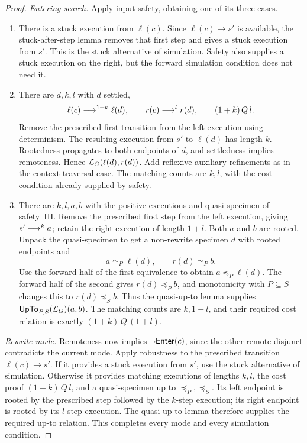 \begin{proof}
\emph{Entering search.} Apply input-safety, obtaining one of its three
cases.
\begin{enumerate}[label=\textup{(\Roman*)}]
\item There is a stuck execution from $\ell(c)$. Since
  $\ell(c)\to s'$ is available, the stuck-after-step lemma removes
  that first step and gives a stuck execution from $s'$. This is the
  stuck alternative of simulation. Safety also supplies a stuck execution
  on the right, but the forward simulation condition does not need it.
\item There are $d,k,l$ with $d$ settled,
  \[
    \ell(c)\mathrel{\longrightarrow^{1+k}}\ell(d),\qquad r(c)\mathrel{\longrightarrow^{l}}r(d),\qquad
    (1+k)\,Q\,l.
  \]
  Remove the prescribed first transition from the left execution using
  determinism. The resulting execution from $s'$ to $\ell(d)$ has
  length $k$. Rootedness propagates to both endpoints of $d$, and
  settledness implies remoteness. Hence
  $\mathcal L_G(\ell(d),r(d))$. Add reflexive auxiliary refinements as in
  the context-traversal case. The matching counts are $k,l$, with the
  cost condition already supplied by safety.
\item There are $k,l,a,b$ with the positive executions and quasi-specimen
  of safety~III. Remove the prescribed first step from the left execution,
  giving $s'\mathrel{\longrightarrow^{k}}a$; retain the right execution of length $1+l$.
  Both $a$ and $b$ are rooted. Unpack the quasi-specimen to get a
  non-rewrite specimen $d$ with rooted endpoints and
  \[
     a\simeq_P\ell(d),\qquad r(d)\simeq_P b.
  \]
  Use the forward half of the first equivalence to obtain
  $a\preceq_P\ell(d)$. The forward half of the second gives
  $r(d)\preceq_P b$, and monotonicity with $P\subseteq S$ changes
  this to $r(d)\preceq_S b$. Thus the quasi-up-to lemma supplies
  $\mathsf{UpTo}_{P,S}(\mathcal L_G)(a,b)$. The matching counts are $k,1+l$,
  and their required cost relation is exactly
  $(1+k)\,Q\,(1+l)$.
\end{enumerate}

\emph{Rewrite mode.} Remoteness now implies $\neg\mathsf{Enter}(c)$, since
the other remote disjunct contradicts the current mode. Apply robustness
to the prescribed transition $\ell(c)\to s'$. If it provides a stuck
execution from $s'$, use the stuck alternative of simulation. Otherwise
it provides matching executions of lengths $k,l$, the cost proof
$(1+k)\,Q\,l$, and a quasi-specimen up to $\preceq_P,\preceq_S$.
Its left endpoint is rooted by the prescribed step followed by the
$k$-step execution; its right endpoint is rooted by its $l$-step
execution. The quasi-up-to lemma therefore supplies the required up-to
relation. This completes every mode and every simulation condition.
\end{proof}

